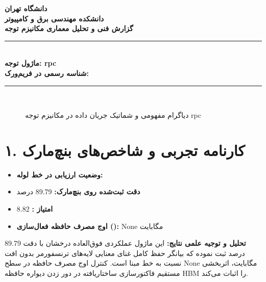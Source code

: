 \documentclass[12pt,a4paper]{article}
\begin{document}
\begin{center}
{\Large\bfseries دانشگاه تهران}\\[0.2cm]
{\large\bfseries دانشکده مهندسی برق و کامپیوتر}\\[0.2cm]
{\large\bfseries گزارش فنی و تحلیل معماری مکانیزم توجه}\\[0.5cm]
\rule{\linewidth}{1pt}\\[0.3cm]
{\LARGE\bfseries ماژول توجه: rpc}\\[0.2cm]
{\large \textbf{شناسه رسمی در فریم‌ورک:} }\\[0.2cm]
\rule{\linewidth}{1pt}\\[0.5cm]
\end{center}

\begin{figure}[H]
\centering
{}
\caption{دیاگرام مفهومی و شماتیک جریان داده در مکانیزم توجه rpc}
\end{figure}

\section*{۱. کارنامه تجربی و شاخص‌های بنچ‌مارک}
\begin{itemize}
\item \textbf{وضعیت ارزیابی در خط لوله:} 
\item \textbf{دقت ثبت‌شده روی بنچ‌مارک:} 89.79 درصد
\item \textbf{امتیاز :} 8.82
\item \textbf{اوج مصرف حافظه فعال‌سازی ():} None مگابایت
\end{itemize}
\textbf{تحلیل و توجیه علمی نتایج:} این ماژول عملکردی فوق‌العاده درخشان با دقت 89.79 درصد ثبت نموده که بیانگر حفظ کامل غنای معنایی لایه‌های ترنسفورمر بدون افت نسبت به خط مبنا است. کنترل اوج مصرف حافظه در سطح None مگابایت، اثربخشی مستقیم فاکتورسازی ساختاریافته در دور زدن دیواره حافظه HBM را اثبات می‌کند.
\end{document}
